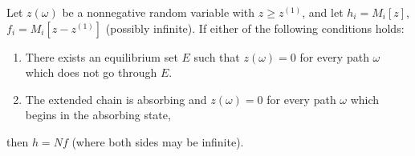 Let $z(\omega)$ be a nonnegative random variable with $z \geq z^{(1)}$, and let $h_i = M_i[z]$, $f_i = M_i[z - z^{(1)}]$ (possibly infinite). If either of the following conditions holds:
\begin{enumerate}
\item There exists an equilibrium set $E$ such that $z(\omega) = 0$ for every path $\omega$ which does not go through $E$.
\item The extended chain is absorbing and $z(\omega) = 0$ for every path $\omega$ which begins in the absorbing state,
\end{enumerate}
then $h = Nf$ (where both sides may be infinite).
